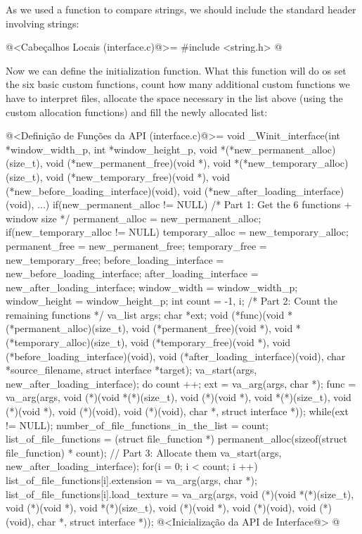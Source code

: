 As we used a function to compare strings, we should include the
standard header involving strings:

\iniciocodigo
@<Cabeçalhos Locais (interface.c)@>=
#include <string.h>
@
\fimcodigo


Now we can define the initialization function. What this function will
do os set the six basic custom functions, count how many additional
custom functions we have to interpret files, allocate the space
necessary in the list above (using the custom allocation functions)
and fill the newly allocated list:

\iniciocodigo
@<Definição de Funções da API (interface.c)@>=
void _Winit_interface(int *window_width_p, int *window_height_p,
                      void *(*new_permanent_alloc)(size_t),
                      void (*new_permanent_free)(void *),
                      void *(*new_temporary_alloc)(size_t),
                      void (*new_temporary_free)(void *),
                      void (*new_before_loading_interface)(void),
                      void (*new_after_loading_interface)(void), ...){
  if(new_permanent_alloc != NULL) /* Part 1: Get the 6 functions + window size */
    permanent_alloc = new_permanent_alloc;
  if(new_temporary_alloc != NULL)
    temporary_alloc = new_temporary_alloc;
  permanent_free = new_permanent_free;
  temporary_free = new_temporary_free;
  before_loading_interface = new_before_loading_interface;
  after_loading_interface = new_after_loading_interface;
  window_width = window_width_p;
  window_height = window_height_p;
  {
    int count = -1, i; /* Part 2: Count the remaining functions */
    va_list args;
    char *ext;
    void (*func)(void *(*permanent_alloc)(size_t),
                 void (*permanent_free)(void *), void *(*temporary_alloc)(size_t),
                 void (*temporary_free)(void *),
                 void (*before_loading_interface)(void),
                 void (*after_loading_interface)(void),
                 char *source_filename, struct interface *target);
    va_start(args, new_after_loading_interface);
    do{
      count ++;
      ext = va_arg(args, char *);
      func = va_arg(args, void (*)(void *(*)(size_t), void (*)(void *),
                                   void *(*)(size_t), void (*)(void *),
                                   void (*)(void), void (*)(void),
                                   char *, struct interface *)); 
    } while(ext != NULL);
    number_of_file_functions_in_the_list = count;
    list_of_file_functions = (struct file_function *)
                               permanent_alloc(sizeof(struct file_function) * 
                                               count); // Part 3: Allocate them
    va_start(args, new_after_loading_interface);
    for(i = 0; i < count; i ++){
      list_of_file_functions[i].extension = va_arg(args, char *);
      list_of_file_functions[i].load_texture =
             va_arg(args, void (*)(void *(*)(size_t), void (*)(void *),
                                   void *(*)(size_t), void (*)(void *),
                                   void (*)(void), void (*)(void),
                                   char *, struct interface *));
    }
  }
  @<Inicialização da API de Interface@>
}
@
\fimcodigo

